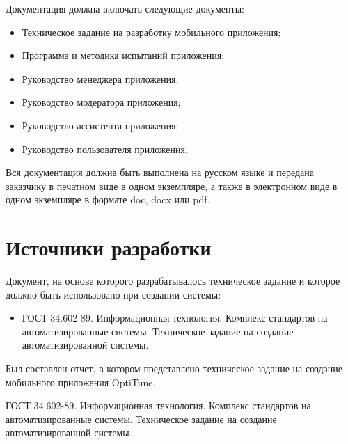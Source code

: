 \documentclass[14pt]{extreport}
\begin{document}
Документация должна включать следующие документы:
\begin{itemize}
	\item Техническое задание на разработку мобильного приложения;
	\item Программа и методика испытаний приложения;
	\item Руководство менеджера приложения;
	\item Руководство модератора приложения;
	\item Руководство ассистента приложения;
	\item Руководство пользователя приложения.
\end{itemize}

Вся документация должна быть выполнена на русском языке и передана заказчику в печатном виде в одном экземпляре, а также в электронном виде в одном экземпляре в формате doc, docx или pdf.


\chapter{Источники разработки}
Документ, на основе которого разрабатывалось техническое задание и которое должно быть использовано при создании системы:
\begin{itemize}
	\item ГОСТ 34.602-89. Информационная технология. Комплекс стандартов на автоматизированные системы. Техническое задание на создание автоматизированной системы.
\end{itemize}


\conclusions

Был составлен отчет, в котором представлено техническое задание на создание мобильного приложения OptiTune.


\newpage
\begin{thebibliography}{99}

 ГОСТ 34.602-89. Информационная технология. Комплекс стандартов на автоматизированные системы. Техническое задание на создание автоматизированной системы.

\end{thebibliography}
\end{document}
